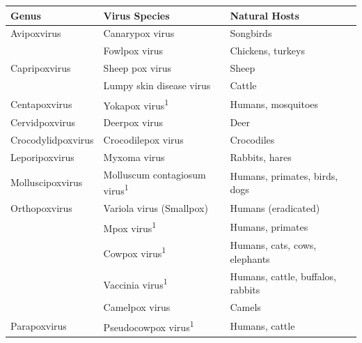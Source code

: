 \renewcommand{\arraystretch}{1.4}
\begin{table}[ht!]
	\begin{tabular}{lll}
	\hline
	\textbf{Genus}      & \textbf{Virus Species}                          & \textbf{Natural Hosts}                      \\ \hline
	Avipoxvirus         & Canarypox virus                                 & Songbirds 									\\ 
						& Fowlpox virus                                   & Chickens, turkeys                           \\ \hline
	Capripoxvirus       & Sheep pox virus                                 & Sheep                                       \\
	                    & Lumpy skin disease virus                        & Cattle                                      \\ \hline
	Centapoxvirus       & Yokapox virus\textsuperscript{1}                & Humans, mosquitoes                          \\ \hline
	Cervidpoxvirus      & Deerpox virus                                   & Deer                                        \\ \hline
	Crocodylidpoxvirus  & Crocodilepox virus                              & Crocodiles                                  \\ \hline
	Leporipoxvirus      & Myxoma virus                                    & Rabbits, hares                              \\ \hline
	Molluscipoxvirus    & Molluscum contagiosum virus\textsuperscript{1}  & Humans, primates, birds, dogs               \\ \hline
	Orthopoxvirus       & Variola virus (Smallpox)                        & Humans (eradicated)                         \\ 
						& Mpox virus\textsuperscript{1}                   & Humans, primates                            \\ 
						& Cowpox virus\textsuperscript{1}                 & Humans, cats, cows, elephants               \\ 
						& Vaccinia virus\textsuperscript{1}               & Humans, cattle, buffalos, rabbits           \\ 
						& Camelpox virus                                  & Camels                                      \\ \hline
	Parapoxvirus        & Pseudocowpox virus\textsuperscript{1}           & Humans, cattle                              \\ 

\end{tabular}
\end{table}
